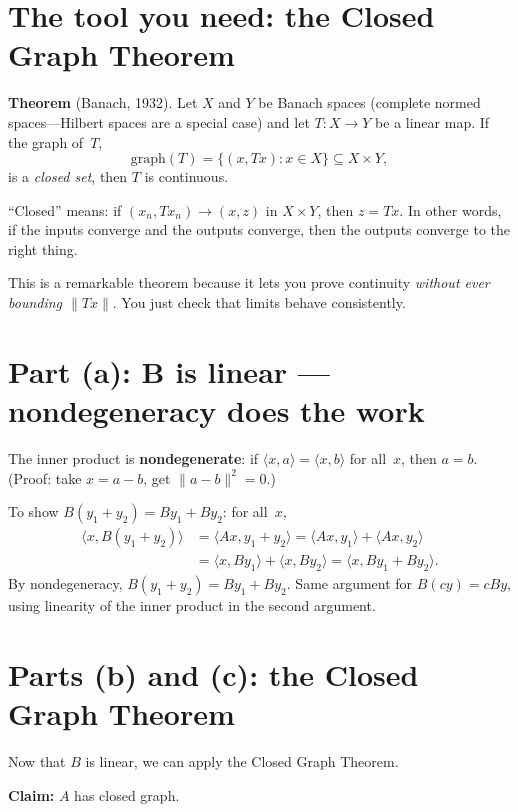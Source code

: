 \section{The tool you need: the Closed Graph Theorem}

\textbf{Theorem} (Banach, 1932). Let $X$ and $Y$ be Banach spaces
(complete normed spaces---Hilbert spaces are a special case) and let
$T : X \to Y$ be a linear map. If the graph of~$T$,
\[
  \mathrm{graph}(T) = \{(x, Tx) : x \in X\} \subseteq X \times Y,
\]
is a \emph{closed set}, then $T$ is continuous.

``Closed'' means: if $(x_n, Tx_n) \to (x, z)$ in $X \times Y$, then
$z = Tx$. In other words, if the inputs converge and the outputs converge,
then the outputs converge to the right thing.

This is a remarkable theorem because it lets you prove continuity
\emph{without ever bounding $\|Tx\|$}. You just check that limits
behave consistently.

\section{Part (a): B is linear --- nondegeneracy does the work}

The inner product is \textbf{nondegenerate}: if $\langle x, a \rangle =
\langle x, b \rangle$ for all~$x$, then $a = b$. (Proof: take $x =
a - b$, get $\|a - b\|^2 = 0$.)

To show $B(y_1 + y_2) = By_1 + By_2$: for all~$x$,
\begin{align*}
  \langle x, B(y_1 + y_2) \rangle
  &= \langle Ax, y_1 + y_2 \rangle
  = \langle Ax, y_1 \rangle + \langle Ax, y_2 \rangle \\
  &= \langle x, By_1 \rangle + \langle x, By_2 \rangle
  = \langle x, By_1 + By_2 \rangle.
\end{align*}
By nondegeneracy, $B(y_1 + y_2) = By_1 + By_2$. Same argument for
$B(cy) = cBy$, using linearity of the inner product in the second
argument.

\section{Parts (b) and (c): the Closed Graph Theorem}

Now that $B$ is linear, we can apply the Closed Graph Theorem.

\textbf{Claim:} $A$ has closed graph.

